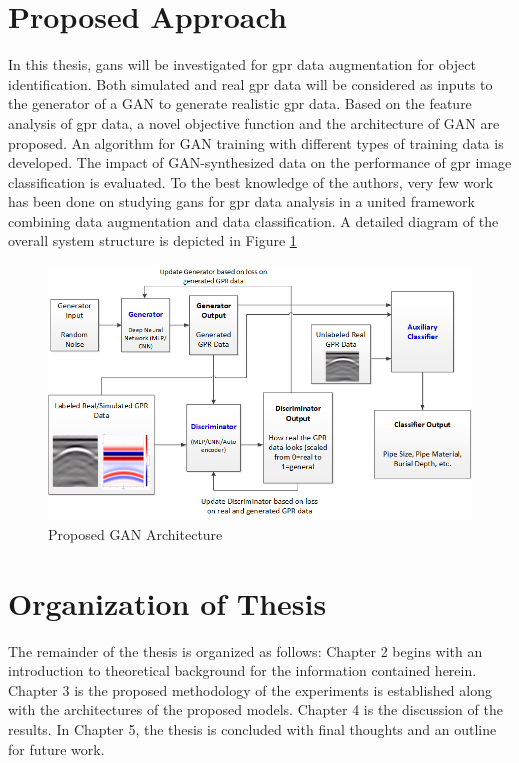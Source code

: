 \section{Proposed Approach}
In this thesis, \acrfull{gans} will be investigated for \acrshort{gpr} data augmentation for object identification. Both simulated and real \acrshort{gpr} data will be considered as inputs to the generator of a GAN to generate realistic \acrshort{gpr} data. Based on the feature analysis of \acrshort{gpr} data, a novel objective function and the architecture of GAN are proposed. An algorithm for GAN training with different types of training data is developed. The impact of GAN-synthesized data on the performance of \acrshort{gpr} image classification is evaluated. To the best knowledge of the authors, very few work has been done on studying \acrshort{gans} for \acrshort{gpr} data analysis in a united framework combining data augmentation and data classification. A detailed diagram of the overall system structure is depicted in Figure \ref{fig:GAN_Architecture}

\begin{figure}[H]
  \centering
  \includegraphics[width=1.0\linewidth]{figures/GAN_Figure.png}
  \caption{Proposed GAN Architecture}
  \label{fig:GAN_Architecture}
\end{figure}

\section{Organization of Thesis}
The remainder of the thesis is organized as follows: Chapter 2 begins with an introduction to theoretical background for the information contained herein. Chapter 3 is the proposed methodology of the experiments is established along with the architectures of the proposed models. Chapter 4 is the discussion of the results. In Chapter 5, the thesis is concluded with final thoughts and an outline for future work.
